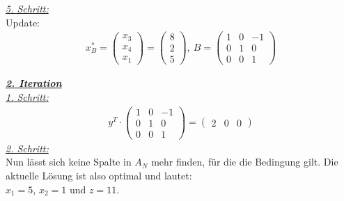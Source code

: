 \documentclass [a4paper,11pt]{article}
\begin{document}
\begin{enumerate}
\begin{enumerate}
            \underline{\textit{5. Schritt:}}\\
            Update:
            \begin{align*}
                x^*_B =
                \begin{pmatrix}
                    x_3\\ x_4\\ x_1
                \end{pmatrix}
                =
                \begin{pmatrix}
                    8\\ 2\\ 5
                \end{pmatrix},\ B=
                \begin{pmatrix}
                    1 & 0 & -1\\
                    0 & 1 & 0\\
                    0 & 0 & 1
                \end{pmatrix}
            \end{align*}

            \underline{\textbf{\textit{2. Iteration}}}\\
            \underline{\textit{1. Schritt:}}\\
            \begin{align*}
                y^T \cdot
                \begin{pmatrix}
                    1 & 0 & -1\\
                    0 & 1 & 0\\
                    0 & 0 & 1
                \end{pmatrix} =
                \begin{pmatrix}
                    2 & 0 & 0
                \end{pmatrix}
            \end{align*}
            \underline{\textit{2. Schritt:}}\\
            Nun lässt sich keine Spalte in $A_N$ mehr finden, für die die Bedingung gilt. Die aktuelle Lösung ist also optimal und lautet:\\
            $x_1 = 5$, $x_2 = 1$ und $z = 11$.



\end{enumerate}
\end{enumerate}
\end{document}
